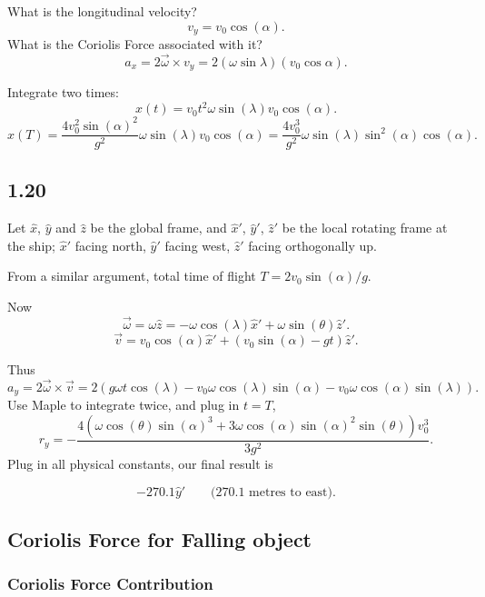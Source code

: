 What is the longitudinal velocity?
\[
	v_y = v_0 \cos(\alpha)
.\] 
What is the Coriolis Force associated with it?
\[
	a_x = 2 \vec{\omega} \times v_y = 2 (\omega \sin \lambda) (v_0 \cos \alpha)
.\] 

Integrate two times:
\[
	x(t) = v_0 t^2 \omega \sin(\lambda) v_0 \cos(\alpha)
.\] 
\[
	x(T) = \frac{4 v_0^2 \sin(\alpha)^2}{g^2} \omega \sin(\lambda) v_0 \cos(\alpha) = \frac{4v_0^3}{ g^2} \omega \sin(\lambda) \sin^2(\alpha) \cos(\alpha)
.\] 

\subsection{1.20}

Let $\hat{x} $, $\hat{y} $ and $\hat{z} $ be the global frame, and $\hat{x} '$, $\hat{y} '$, $\hat{z} '$ be the local rotating frame at the ship; $\hat{x} '$ facing north, $\hat{y} '$ facing west, $\hat{z} '$ facing orthogonally up.

From a similar argument, total time of flight  $T = 2 v_0 \sin(\alpha) / g$.

Now
\[
	\vec{\omega}  = \omega \hat{z}  = - \omega \cos(\lambda) \hat{x} ' + \omega \sin(\theta) \hat{z} ' 
.\] 
\[
	\vec{v}  = v_0 \cos(\alpha) \hat{x} ' + (v_0 \sin(\alpha) - gt) \hat{z}' 
.\] 

Thus
\[
	a_y = 2 \vec{\omega}  \times \vec{v}  = 2\left( g \omega t \cos(\lambda) - v_0 \omega \cos(\lambda) \sin(\alpha) - v_0 \omega \cos(\alpha) \sin(\lambda) \right) 
.\] 
Use Maple to integrate twice, and plug in $t = T$,
\[
	r_y = - \frac{4 \left( \omega \cos(\theta) \sin (\alpha)^3 + 3 \omega \cos(\alpha) \sin(\alpha)^2 \sin(\theta) \right) v_0^3 }{3 g^2}
.\] 
Plug in all physical constants, our final result is

\[
	-270.1 \hat{y} ' \qquad \text{(270.1 metres to east)}
.\] 




\subsection{Coriolis Force for Falling object}

\subsubsection{Coriolis Force Contribution}


